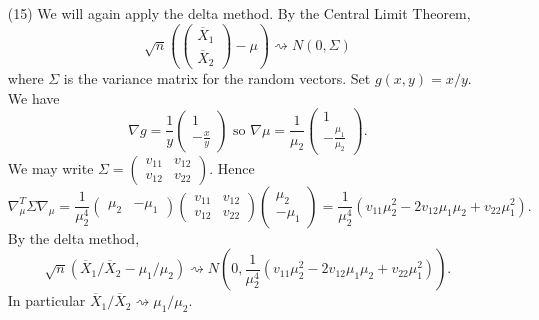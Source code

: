 \documentclass[10pt]{article}
\begin{document}
\begin{enumerate}
\item[(15)]
We will again apply the delta method. By the Central Limit Theorem,
\[
\sqrt{n}\left(\begin{pmatrix} \overline X_1 \\ \overline X_2 \end{pmatrix} - \mu \right)
\rightsquigarrow N(0,\Sigma)
\]
where $\Sigma$ is the variance matrix for the random vectors.
Set $g(x,y)=x/y$. We have
\[
\nabla g = \frac{1}{y} \begin{pmatrix} 1 \\ -\frac{x}{y} \end{pmatrix} \text{ so }
\nabla \mu = \frac{1}{\mu_2} \begin{pmatrix} 1 \\ -\frac{\mu_1}{\mu_2}\end{pmatrix}.
\]
We may write
$\Sigma = \begin{pmatrix} v_{11} & v_{12} \\ v_{12} & v_{22} \end{pmatrix}$.
Hence
\[
\nabla_\mu^T \Sigma \nabla_\mu =
\frac{1}{\mu_2^4} \begin{pmatrix} \mu_2 & -\mu_1\end{pmatrix}
\begin{pmatrix} v_{11} & v_{12} \\ v_{12} & v_{22} \end{pmatrix}
\begin{pmatrix} \mu_2 \\ -\mu_1 \end{pmatrix} =
\frac{1}{\mu_2^4}(v_{11}\mu_2^2 - 2v_{12}\mu_1\mu_2 + v_{22}\mu_1^2).
\]
By the delta method,
\[
\sqrt{n}(\overline X_1/\overline X_2 - \mu_1/\mu_2) \rightsquigarrow
N\left(0,\frac{1}{\mu_2^4}(v_{11}\mu_2^2 - 2v_{12}\mu_1\mu_2 + v_{22}\mu_1^2)\right).
\]
In particular $\overline X_1/\overline X_2 \rightsquigarrow \mu_1/\mu_2$.

\end{enumerate}
\end{document}
